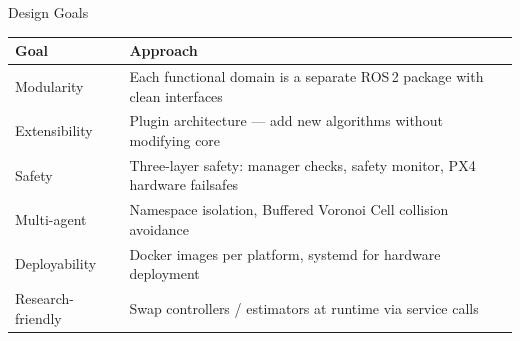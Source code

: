 \documentclass[aspectratio=169, 10pt]{beamer}
\begin{document}
\begin{frame}{Design Goals}
\begin{tabularx}{\textwidth}{@{}lX@{}}
\toprule
\textbf{Goal} & \textbf{Approach} \\
\midrule
Modularity & Each functional domain is a separate ROS\,2 package with clean interfaces \\
Extensibility & Plugin architecture --- add new algorithms without modifying core \\
Safety & Three-layer safety: manager checks, safety monitor, PX4 hardware failsafes \\
Multi-agent & Namespace isolation, Buffered Voronoi Cell collision avoidance \\
Deployability & Docker images per platform, systemd for hardware deployment \\
Research-friendly & Swap controllers / estimators at runtime via service calls \\
\bottomrule
\end{tabularx}
\end{frame}
\end{document}
